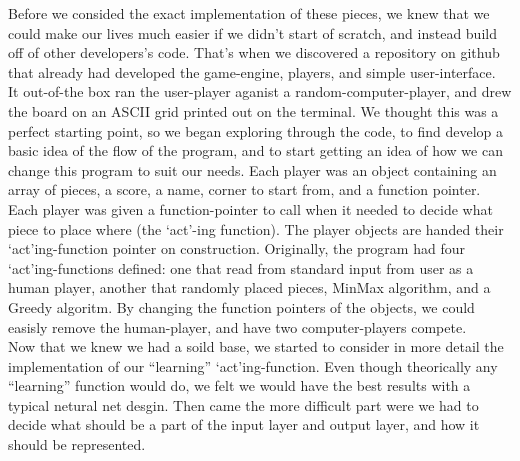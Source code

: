 \documentclass{report}
\begin{document}
	Before we consided the exact implementation of these pieces, we knew that we could make our lives much easier if we didn't start of scratch, and instead build off of other developers's code.
	That's when we discovered a repository on github that already had developed the game-engine, players, and simple user-interface.\\
	It out-of-the box ran the user-player aganist a random-computer-player, and drew the board on an ASCII grid printed out on the terminal. We thought this was a perfect starting point,
	so we began exploring through the code, to find develop	a basic idea of the flow of the program, and to start getting an idea of how we can change this program to suit our needs.
	Each player was an object containing an array of pieces, a score, a name, corner to start from, and a function pointer. Each player was given a function-pointer to call when it needed
	to decide what piece to place where (the `act'-ing function). The player objects are handed their `act'ing-function pointer on construction. Originally, the program had four `act'ing-functions
	defined: one that read from standard input from user as	a human player, another that randomly placed pieces, MinMax algorithm, and a Greedy algoritm. By changing the function pointers of
	the objects, we could easisly remove the human-player, and have two computer-players compete.\\
	Now that we knew we had a soild base, we started to consider in more detail the implementation of our ``learning'' `act'ing-function. Even though theorically any ``learning'' function would do,
	we felt we would have the best results with a typical netural net desgin. Then came the more difficult part were we had to decide what should be a part of the input layer and output layer,
	and how it should be represented.
	
\end{document}
